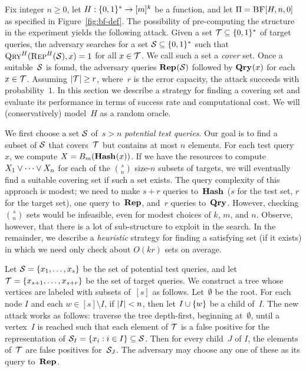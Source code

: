\label{app:unsalted-attack}
Fix integer $n \geq0$, let $H:\{0,1\}^*\to[m]^k$ be a function,  and let
$\Pi = \textnormal{\textsc{BF}}[H,n,0]$ as specified in Figure~\ref{fig:bf-def}.
%
The possibility of pre-computing the structure in the  experiment yields the
following attack. Given a set $\mathcal{T}\subseteq\{0,1\}^*$ of target queries, the
adversary searches for a set $\mathcal{S}\subseteq\{0,1\}^*$ such that
$\textnormal{\textsc{Qry}}^H(\textnormal{\textsc{Rep}}^H(\mathcal{S}), x) = 1$ for all $x \in \mathcal{T}$. We call such a set a
\emph{cover} set.
%
Once a suitable~$\mathcal{S}$ is found, the adversary queries $\textup{\textbf{Rep}}\hspace{0.5pt}(\mathcal{S})$ followed
by $\textup{\textbf{Qry}}\hspace{0.5pt}(x)$ for each $x\in\mathcal{T}$.
%
Assuming $|\mathcal{T}| \geq r$, where~$r$ is the error capacity, the attack succeeds
with probability~$1$.
%
In this section we describe a strategy for finding a covering set and evaluate
its performance in terms of success rate and computational cost. We will
(conservatively) model~$H$ as a random oracle.

We first choose a set $\mathcal{S}$ of~$s > n$ \emph{potential test queries}. Our goal is to find a subset of $\mathcal{S}$ that covers~$\mathcal{T}$ but contains at most $n$ elements.
%
For each test query~$x$, we compute $X = {B}_m(\textup{\textbf{Hash}}\hspace{0.5pt}(x))$. If we have the
resources to compute $X_1 \vee \cdots \vee X_n$ for each of the ${s}\choose{n}$
size-$n$ subsets of targets, we will eventually find a suitable covering set if
such a set exists.
%
The query complexity of this approach is modest; we need to make $s+r$ queries
to~$\textup{\textbf{Hash}}\hspace{0.5pt}$ ($s$ for the test set, $r$ for the target set), one query
to~$\textup{\textbf{Rep}}\hspace{0.5pt}$, and~$r$ queries to~$\textup{\textbf{Qry}}\hspace{0.5pt}$. However, checking $\binom{s}{n}$ sets
would be infeasible, even for modest choices of $k$, $m$, and $n$. Observe,
however, that there is a lot of sub-structure to exploit in the search.
%
In the remainder, we describe a \emph{heuristic} strategy for finding a
satisfying set (if it exists) in which we need only check about $O(kr)$ sets on
average.

Let $\mathcal{S} = \{x_1, \ldots, x_s\}$ be the set of potential test queries, and let $\mathcal{T} =
\{x_{s+1}, \ldots, x_{s+r}\}$ be the set of target queries.
%
We construct a tree whose vertices are labeled with subsets of~$[s]$ as follows.
%
Let~$\emptyset$ be the root.
%
For each node $I$ and each $w \in [s] \setminus I$, if $|I| < n$, then let $I
\cup \{ w \}$ be a child of~$I$.
%
The new attack works as follows: traverse the tree depth-first, beginning
at~$\emptyset$, until a vertex~$I$ is reached such that each element of $\mathcal{T}$ is
a false positive for the representation of $\mathcal{S}_I = \{ x_i : i \in I \}
\subseteq \mathcal{S}$.
%
Then for every child~$J$ of $I$, the elements of~$\mathcal{T}$ are false positives
for~$\mathcal{S}_J$. The adversary may choose any one of these as its query
to~$\textup{\textbf{Rep}}\hspace{0.5pt}$.

